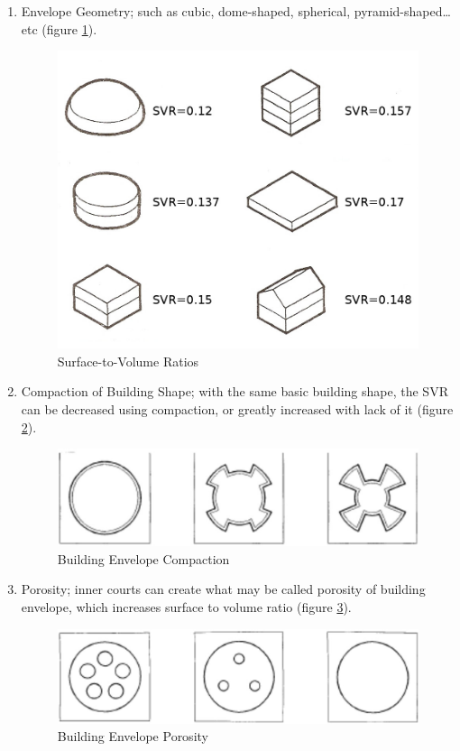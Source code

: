 \begin{enumerate}
	\item Envelope Geometry; such as cubic, dome-shaped, spherical, pyramid-shaped\ldots{}etc (figure \ref{fig:SVR}).
		\begin{figure}[H]
			\centering
			\includegraphics[width=\textwidth]{./Images/3-SVR}
			\caption{Surface-to-Volume Ratios}
			\label{fig:SVR}
		\end{figure}
	\item Compaction of Building Shape; with the same basic building shape, the SVR can be decreased using compaction, or greatly increased with		  lack of it (figure \ref{fig:Compaction}).
		\begin{figure}[H]
			\centering
			\includegraphics[width=\textwidth]{./Images/4-Compaction}
			\caption{Building Envelope Compaction}
			\label{fig:Compaction}
		\end{figure}
	\item Porosity; inner courts can create what may be called porosity of building envelope, which increases surface to volume ratio (figure 		\ref{fig:Porosity}).
		\begin{figure}[H]
			\centering
			\includegraphics[width=\textwidth]{./Images/5-Porosity}
			\caption{Building Envelope Porosity}
			\label{fig:Porosity}
		\end{figure}
\end{enumerate}

